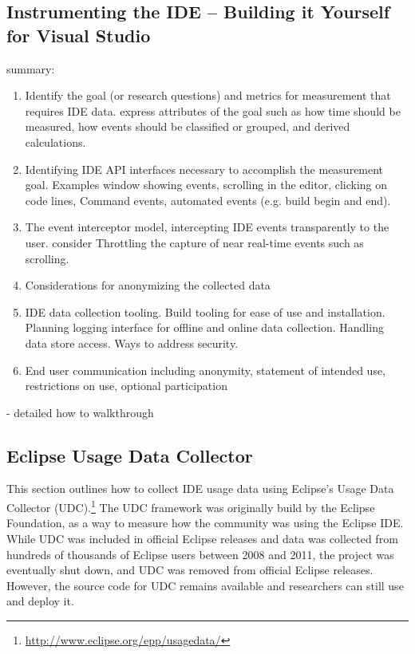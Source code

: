 \subsection{Instrumenting the IDE -- Building it Yourself for Visual Studio} %
\label{buildItYourself}
 summary:
\begin{enumerate}
	\item
	Identify the goal (or research questions) and metrics for measurement that requires IDE data.  express attributes of the goal such as how time should be measured, how events should be classified or grouped, and derived calculations.
	\item
	Identifying  IDE API interfaces necessary to accomplish the measurement goal.  Examples window showing events, scrolling in the editor, clicking on code lines, Command events, automated events (e.g. build begin and end).
	\item
	The event interceptor model, intercepting IDE events transparently to the user.  consider Throttling the capture of near real-time events such as scrolling.
	\item
	Considerations for anonymizing the collected data
	\item
	IDE data collection tooling.  Build tooling for ease of use and installation.  Planning logging interface for offline and online data collection.  Handling data store access.  Ways to address security.
	\item
	End user communication including anonymity, statement of intended use, restrictions on use, optional participation
	
\end{enumerate}
- detailed how to walkthrough

\subsection{Eclipse Usage Data Collector}

This section outlines how to collect IDE usage data using Eclipse's Usage Data 
Collector (UDC).\footnote{\url{http://www.eclipse.org/epp/usagedata/}}
The UDC framework was originally build by the Eclipse Foundation, as a way to measure how the
community was using the Eclipse IDE.
While UDC was included in official Eclipse releases and data was collected from
hundreds of thousands of Eclipse users between 2008 and 2011, the project was eventually shut down,
and UDC was removed from official Eclipse releases.
However, the source code for UDC remains available and researchers can still use and deploy it.

